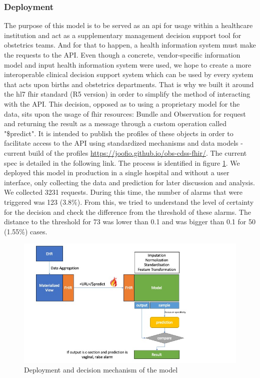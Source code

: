 \subsubsection{Deployment}
The purpose of this model is to be served as an \ac{api} for usage within a healthcare institution and act as a supplementary management decision support tool for obstetrics teams. And for that to happen, a health information system must make the requests to the API. Even though a concrete, vendor-specific information model and input health information system were used, we hope to create a more interoperable clinical decision support system which can be used by every system that acts upon births and obstetrics departments. That is why we built it around the \ac{hl7} \ac{fhir} standard (R5 version) in order to simplify the method of interacting with the API. This decision, opposed as to using a proprietary model for the data, sits upon the usage of \ac{fhir} resources: Bundle and Observation for request and returning the result as a message through a custom operation called "\$predict". It is intended to publish the profiles of these objects in order to facilitate access to the API using standardized mechanisms and data models - current build of the profiles \url{https://joofio.github.io/obs-cdss-fhir/}. The current spec is detailed in the following link. The process is identified in figure \ref{fig:deploy}.
We deployed this model in production in a single hospital and without a user interface, only collecting the data and prediction for later discussion and analysis. We collected 3231 requests. During this time, the number of alarms that were triggered was 123 (3.8\%). From this, we tried to understand the level of certainty for the decision and check the difference from the threshold of these alarms. The distance to the threshold for 73 was lower than 0.1 and was bigger than 0.1 for 50 (1.55\%) cases.

\begin{figure}[htbp]
\centering
\captionsetup{justification=centering}
\caption{Deployment and decision mechanism of the model}\label{fig:deploy} 
\includegraphics[scale=0.60]{figures/obs-model.jpg}
\end{figure}

